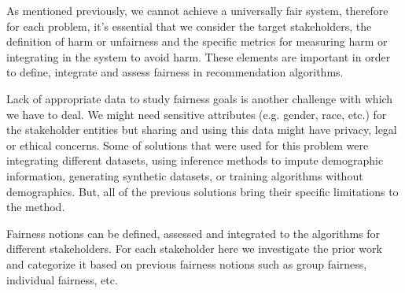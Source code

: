     

As mentioned previously, we cannot achieve a universally fair system, therefore for each problem, it's essential that we consider the target stakeholders, the definition of harm or unfairness and the specific metrics for measuring harm or integrating in the system to avoid harm. These elements are important in order to define, integrate and assess fairness in recommendation algorithms.


Lack of appropriate data to study fairness goals is another challenge with which we have to deal. We might need sensitive attributes (e.g. gender, race, etc.) for the stakeholder entities but sharing and using this data might have privacy, legal or ethical concerns. Some of solutions that were used for this problem were integrating different datasets, using inference methods to impute demographic information, generating synthetic datasets, or training algorithms without demographics. But, all of the previous solutions bring their specific limitations to the method. 

Fairness notions can be defined, assessed and integrated to the algorithms for different stakeholders. For each stakeholder here we investigate the prior work and categorize it based on previous fairness notions such as group fairness, individual fairness, etc.


